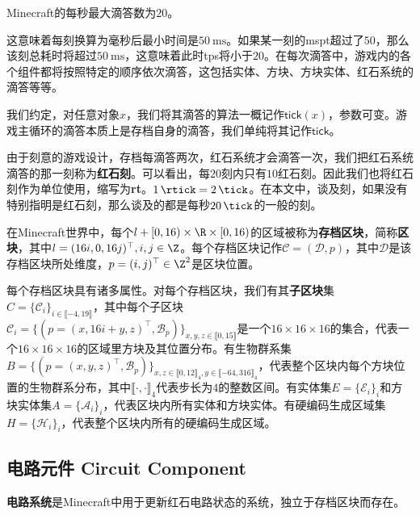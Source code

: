 \documentclass[a4,11pt]{aleph-notas}
\begin{document}
\begin{fact}
    Minecraft的每秒最大滴答数为$20$。
\end{fact}

这意味着每刻换算为毫秒后最小时间是$\qty{50}{\ms}$。如果某一刻的mspt超过了$50$，那么该刻总耗时将超过$\qty{50}{\ms}$，这意味着此时tps将小于$20$。在每次滴答中，游戏内的各个组件都将按照特定的顺序依次滴答，这包括实体、方块、方块实体、红石系统的滴答等等。

\begin{conv}
    我们约定，对任意对象$x$，我们将其滴答的算法一概记作$\mathsf{tick}(x)$，参数可变。游戏主循环的滴答本质上是存档自身的滴答，我们单纯将其记作$\mathsf{tick}$。
\end{conv}

由于刻意的游戏设计，存档每滴答两次，红石系统才会滴答一次，我们把红石系统滴答的那一刻称为\textbf{红石刻}。可以看出，每$20$刻内只有$10$红石刻。因此我们也将红石刻作为单位使用，缩写为\textbf{rt}。$\qty{1}{\rtick}=\qty{2}{\tick}$。在本文中，谈及刻，如果没有特别指明是红石刻，那么谈及的都是每秒$\qty{20}{\tick}$的一般的刻。

\begin{defi}
    在Minecraft世界中，每个$l+[0,16)\times\R\times[0,16)$的区域被称为\textbf{存档区块}，简称\textbf{区块}，其中$l=(16i,0,16j)^\top,i,j\in\Z$。每个存档区块记作$\mathcal{C}=(\mathcal{D},p)$，其中$\mathcal{D}$是该存档区块所处维度，$p=(i,j)^\top\in\Z^2$是区块位置。
\end{defi}

每个存档区块具有诸多属性。对每个存档区块，我们有其\textbf{子区块}集$C=\{\mathcal{C}_i\}_{i\in\llbracket-4,19\rrbracket}$，其中每个子区块$\mathcal{C}_i=\{(p=(x,16i+y,z)^\top,\mathcal{B}_p)\}_{x,y,z\in\llbracket0,15\rrbracket}$是一个$16\times16\times16$的集合，代表一个$16\times16\times16$的区域里方块及其位置分布。有生物群系集$B=\{(p=(x,y,z)^\top,\mathscr{B}_p)\}_{x,z\in\llbracket0,12\rrbracket_4,y\in\llbracket-64,316\rrbracket_4}$，代表整个区块内每个方块位置的生物群系分布，其中$\llbracket\cdot,\cdot\rrbracket_4$代表步长为$4$的整数区间。有实体集$E=\{\mathcal{E}_i\}_i$和方块实体集$A=\{\mathcal{A}_i\}_i$，代表区块内所有实体和方块实体。有硬编码生成区域集$H=\{\mathcal{H}_i\}_i$，代表整个区块内所有的硬编码生成区域。

\subsection{电路元件 Circuit Component}

\begin{defi}
    \textbf{电路系统}是Minecraft中用于更新红石电路状态的系统，独立于存档区块而存在。
\end{defi}
\end{document}
